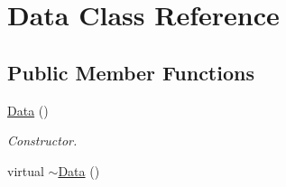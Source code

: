 \hypertarget{classData}{\section{Data Class Reference}
\label{classData}
}
\subsection*{Public Member Functions}
\begin{DoxyCompactItemize}
\item 
\hypertarget{classData_af11f741cb7f587e2e495452a8905a22a}{\hyperlink{classData_af11f741cb7f587e2e495452a8905a22a}{Data} ()}\label{classData_af11f741cb7f587e2e495452a8905a22a}

\begin{DoxyCompactList}\small\item\em Constructor. \end{DoxyCompactList}\item 
\hypertarget{classData_aab31956423290f0d62dcca47ab4d16dd}{virtual \hyperlink{classData_aab31956423290f0d62dcca47ab4d16dd}{$\sim$\+Data} ()}\label{classData_aab31956423290f0d62dcca47ab4d16dd}


\end{DoxyCompactItemize}
